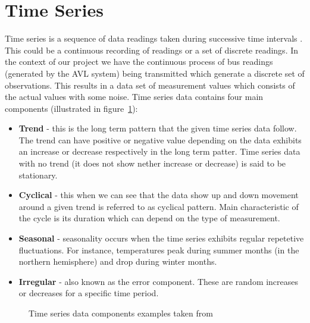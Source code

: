 \section{Time Series}
Time series is a sequence of data readings taken during successive time intervals \cite{shumway2010time}. This could be a continuous recording of readings or a set of discrete readings. In the context of our project we have the continuous process of bus readings (generated by the AVL system) being transmitted which generate a discrete set of observations. This results in a data set of measurement values which consists of the actual values with some noise. Time series data contains four main components (illustrated in figure~\ref{fig:timeSeriesDataComponents})\cite{brockwell2002introduction}:
\begin{itemize}
	\item \textbf{Trend} - this is the long term pattern that the given time series data follow. The trend can have positive or negative value depending on the data exhibits an increase or decrease respectively in the long term patter. Time series data with no trend (it does not show nether increase or decrease) is said to be stationary.
	\item \textbf{Cyclical} - this when we can see that the data show up and down movement around a given trend is referred to as cyclical pattern. Main characteristic of the cycle is its duration which can depend on the type of measurement.
	\item \textbf{Seasonal} - seasonality occurs when the time series exhibits regular repetetive fluctuations. For instance, temperatures peak during summer months (in the northern hemisphere) and drop during winter months.
	\item \textbf{Irregular} - also known as the error component. These are random increases or decreases for a specific time period.
\end{itemize}

\begin{figure}[ht]
	\caption{Time series data components examples taken from \cite{wildchance}}%
	\label{fig:timeSeriesDataComponents}
\end{figure}

